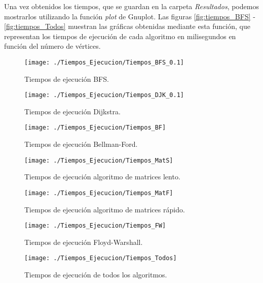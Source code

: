 Una vez obtenidos los tiempos, que se guardan en la carpeta \textit{Resultados}, podemos mostrarlos utilizando la función \textit{plot} de Gnuplot. Las figuras \autoref{fig:tiempos_BFS} - \autoref{fig:tiempos_Todos} muestran las gráficas obtenidas mediante esta función, que representan los tiempos de ejecución de cada algoritmo en milisegundos en función del número de vértices. \\

\begin{figure}[!htb]
	\centering
	\texttt{[image: ./Tiempos\_Ejecucion/Tiempos\_BFS\_0.1]}
	
	\caption{Tiempos de ejecución BFS.}
	\label{fig:tiempos_BFS}
\end{figure}

\begin{figure}[!htb]
	\centering
	\texttt{[image: ./Tiempos\_Ejecucion/Tiempos\_DJK\_0.1]}
	
	\caption{Tiempos de ejecución Dijkstra.}
	\label{fig:tiempos_DJK}
\end{figure}

\begin{figure}[!htb]
	\centering
	\texttt{[image: ./Tiempos\_Ejecucion/Tiempos\_BF]}
	
	\caption{Tiempos de ejecución Bellman-Ford.}
	\label{fig:tiempos_BF}
\end{figure}

\begin{figure}[!htb]
	\centering
	\texttt{[image: ./Tiempos\_Ejecucion/Tiempos\_MatS]}
	
	\caption{Tiempos de ejecución algoritmo de matrices lento.}
	\label{fig:tiempos_MatS}
\end{figure}

\begin{figure}[!htb]
	\centering
	\texttt{[image: ./Tiempos\_Ejecucion/Tiempos\_MatF]}
	
	\caption{Tiempos de ejecución algoritmo de matrices rápido.}
	\label{fig:tiempos_MatF}
\end{figure}

\begin{figure}[!htb]
	\centering
	\texttt{[image: ./Tiempos\_Ejecucion/Tiempos\_FW]}
	
	\caption{Tiempos de ejecución Floyd-Warshall.}
	\label{fig:tiempos_FW}
\end{figure}

\begin{figure}[!htb]
	\centering
	\texttt{[image: ./Tiempos\_Ejecucion/Tiempos\_Todos]}
	
	\caption{Tiempos de ejecución de todos los algoritmos.}
	\label{fig:tiempos_Todos}
\end{figure}

